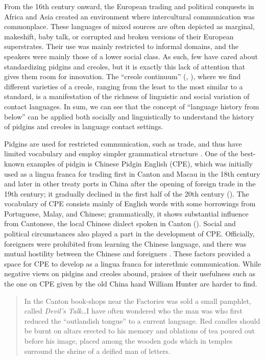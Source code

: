 \documentclass[english,output=paper,colorlinks,citecolor=brown]{../langscibook}
\begin{document}
From the 16th century onward, the European trading and political conquests in Africa and Asia created an environment where intercultural communication was commonplace. These languages of mixed sources are often depicted as marginal, makeshift, baby talk, or corrupted and broken versions of their European superstrates. Their use was mainly restricted to informal domains, and the speakers were mainly those of a lower social class. As such, few have cared about standardizing pidgins and creoles, but it is exactly this lack of attention that gives them room for innovation. The “creole continuum” (\citealt{StewartEtAl1965}, \citealt{Bickerton1975}), where we find different varieties of a creole, ranging from the least to the most similar to a standard, is a manifestation of the richness of linguistic and social variation of contact languages. In sum, we can see that the concept of “language history from below” can be applied both socially and linguistically to understand the history of pidgins and creoles in language contact settings. 


Pidgins are used for restricted communication, such as trade, and thus have limited vocabulary and employ simpler grammatical structure \citep[5]{Holm2000}. One of the best-known examples of pidgin is Chinese Pidgin English (CPE), which was initially used as a lingua franca for trading first in Canton and Macau in the 18th century and later in other treaty ports in China after the opening of foreign trade in the 19th century; it gradually declined in the first half of the 20th century (\citealt{MatthewsLi2013}). The vocabulary of CPE consists mainly of English words with some borrowings from Portuguese, Malay, and Chinese; grammatically, it shows substantial influence from Cantonese, the local Chinese dialect spoken in Canton (\citealt{AnsaldoEtAl2010}). Social and political circumstances also played a part in the development of CPE. Officially, foreigners were prohibited from learning the Chinese language, and there was mutual hostility between the Chinese and foreigners \citep{Baker1990}. These factors provided a space for CPE to develop as a lingua franca for interethnic communication. While negative views on pidgins and creoles abound, praises of their usefulness such as the one on CPE given by the old China hand William Hunter are harder to find.

\newpage
\begin{quote}
    In the Canton book-shops near the Factories was sold a small pamphlet, called \textit{Devil’s Talk}…I have often wondered who the man was who first reduced the ``outlandish tongue'' to a current language. Red candles should be burnt on altars erected to his memory and oblations of tea poured out before his image, placed among the wooden gods which in temples surround the shrine of a deified man of letters. \citep[63]{Hunter1882}  
\end{quote}
\end{document}
